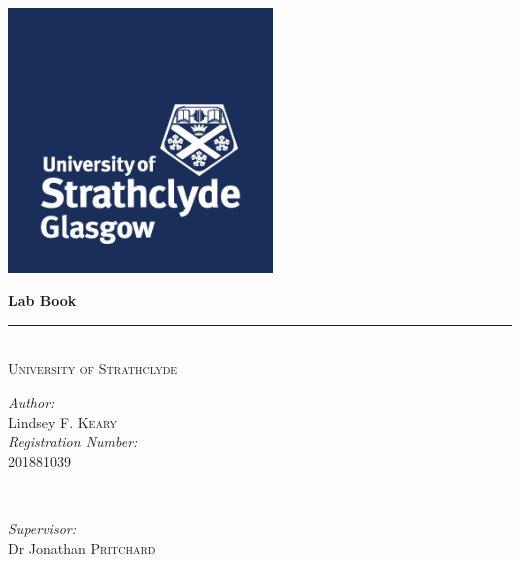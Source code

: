 \documentclass[12pt,oneside]{book}
\begin{document}
\begin{titlepage}

\newcommand{\HRule}{\rule{\linewidth}{0.5mm}} 
\hfill
\includegraphics[width = 70mm]{strathlogo.png}%





\vspace*{3cm} %







\centering
{ \huge \bfseries Lab Book}\\[0.5cm] %
\HRule \\[1cm]
\textsc{\large University of Strathclyde}\\[0.5cm] %

\begin{minipage}{0.4\textwidth}
\begin{flushleft} \large
\emph{Author:}\\
Lindsey F. \textsc{Keary}\\[0.5cm] 
\emph{Registration Number:} \\
201881039 
\end{flushleft}
\end{minipage}
~
\begin{minipage}{0.4\textwidth}
\begin{flushright} \large
\emph{Supervisor:} \\
Dr Jonathan \textsc{Pritchard} \\[0.5cm]
\end{flushright}
\end{minipage}\\[1cm]


\end{titlepage}
\end{document}
